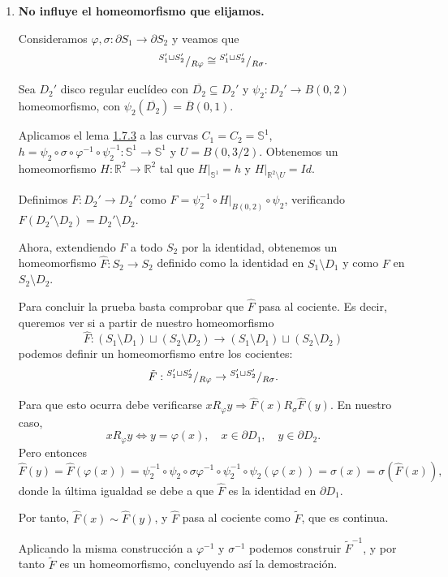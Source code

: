 {\begin{enumerate}
        Pero como $F$ es un homeomorfismo, $S_1 \setminus F(D_4) \cong S_1 \setminus D_4$, concluyendo así el paso 2.

        \item \textbf{No influye el homeomorfismo que elijamos.}

        Consideramos $\varphi,\sigma:\partial S_1\to\partial S_2$ y veamos que
        \[
        {^{S_1'\sqcup S_2'}}/{_{R\varphi}}\cong{^{S_1'\sqcup S_2'}}/{_{R\sigma}}.
        \]

        Sea $D_2'$ disco regular euclídeo con $\overline{D_2}\subseteq D_2'$ y $\psi_2 : D_2' \to B(0,2)$ homeomorfismo, con $\psi_2(\overline{D_2}) = \overline{B}(0,1)$. 

        Aplicamos el lema \hyperref[lem:extension-homeo]{1.7.3} a las curvas $C_1 = C_2 = \mathbb{S}^1$, $h = \psi_2 \circ \sigma \circ \varphi^{-1} \circ \psi_2^{-1} : \mathbb{S}^1\to \mathbb{S}^1$ y $U = B(0,3/2)$. Obtenemos un homeomorfismo $H : \mathbb{R}^2 \to \mathbb{R}^2$ tal que $H\vert_{\mathbb{S}^1} = h$ y $H\vert_{\mathbb{R}^2\setminus U} = Id$. 

        Definimos $F:D_2' \to D_2'$ como $F = \psi_2^{-1} \circ H \vert_{B(0,2)} \circ \psi_2$, verificando $F(D_2'\setminus D_2) = D_2'\setminus D_2$. 

        Ahora, extendiendo $F$ a todo $S_2$ por la identidad, obtenemos un homeomorfismo $\hat{F} : S_2 \to S_2$ definido como la identidad en $S_1 \setminus D_1$ y como $F$ en $ S_2 \setminus D_2$.

        Para concluir la prueba basta comprobar que $\hat{F}$ pasa al cociente. Es decir, queremos ver si a partir de nuestro homeomorfismo 
        \[
        \hat{F} : (S_1\setminus D_1)\sqcup(S_2\setminus D_2) \to (S_1\setminus D_1)\sqcup(S_2\setminus D_2)
        \]
        podemos definir un homeomorfismo entre los cocientes:  
        \[
        \tilde{F} : {^{S_1'\sqcup S_2'}}/{_{R\varphi}} \to {^{S_1'\sqcup S_2'}}/{_{R\sigma}}.
        \]

        Para que esto ocurra debe verificarse $xR_\varphi y \Rightarrow \hat{F}(x) R_\sigma \hat{F}(y)$. En nuestro caso,  
        \[
        xR_\varphi y \iff y = \varphi(x), \quad x\in \partial D_1, \quad y\in \partial D_2. 
        \]
        Pero entonces
        \[
        \hat{F}(y) = \hat{F}(\varphi(x)) = \psi_2^{-1} \circ \psi_2 \circ \sigma \varphi^{-1} \circ \psi_2^{-1} \circ \psi_2(\varphi(x))
        = \sigma(x) = \sigma(\hat{F}(x)),
        \]
        donde la última igualdad se debe a que $\hat{F}$ es la identidad en $\partial D_1$. 

        Por tanto, $\hat{F}(x) \sim \hat{F}(y)$, y $\hat{F}$ pasa al cociente como $\tilde{F}$, que es continua. 

        Aplicando la misma construcción a $\varphi^{-1}$ y $\sigma^{-1}$ podemos construir $\tilde{F}^{-1}$, y por tanto $\tilde{F}$ es un homeomorfismo, concluyendo así la demostración.
    \end{enumerate}
}


